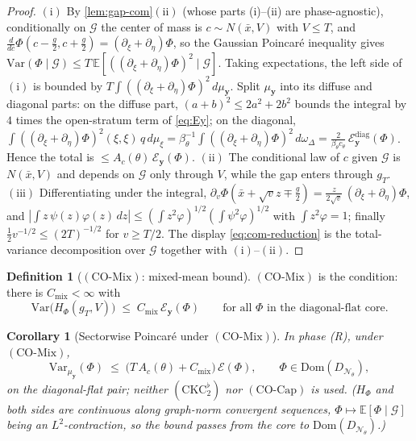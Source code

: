 \documentclass[reqno,final,11pt]{amsart}
\theoremstyle{plain}
\newtheorem{corollary}[theorem]{Corollary}
\theoremstyle{definition}
\newtheorem{definition}[theorem]{Definition}
\theoremstyle{remark}
\newcommand{\E}{\mathbb E}
\newcommand{\Dom}{\mathrm{Dom}}
\newcommand{\cE}{\mathcal E}
\newcommand{\cN}{\mathcal N}
\newcommand{\DN}{D_{\cN_\theta}}
\newcommand{\COcap}{(\mathrm{CO\text{-}Cap})}
\newcommand{\COmix}{(\mathrm{CO\text{-}Mix})}
\begin{document}
\begin{proof}
$(\mathrm i)$ By \cref{lem:gap-com}$(\mathrm{ii})$ (whose parts (i)--(ii) are
phase-agnostic), conditionally on $\mathcal G$ the center of mass is
$c\sim N(\bar x,V)$ with $V\le T$, and
$\tfrac{d}{dc}\Phi(c-\tfrac g2,c+\tfrac g2)=(\partial_\xi+\partial_\eta)\Phi$,
so the Gaussian Poincar\'e inequality gives
$\mathrm{Var}(\Phi\mid\mathcal G)\le T\,
\E[((\partial_\xi+\partial_\eta)\Phi)^2\mid\mathcal G]$. Taking expectations,
the left side of $(\mathrm i)$ is bounded by
$T\int((\partial_\xi+\partial_\eta)\Phi)^2\,d\mu_{\mathbf y}$. Split
$\mu_{\mathbf y}$ into its diffuse and diagonal parts: on the diffuse part,
$(a+b)^2\le2a^2+2b^2$ bounds the integral by $4$ times the open-stratum term of
\eqref{eq:Ey}; on the diagonal,
$\int((\partial_\xi+\partial_\eta)\Phi)^2(\xi,\xi)\,q\,d\mu_\xi
=\beta_\theta^{-1}\int((\partial_\xi+\partial_\eta)\Phi)^2\,d\omega_\Delta
=\tfrac{2}{\beta_\theta c_\theta}\,\cE^{\mathrm{diag}}_{\mathbf y}(\Phi)$.
Hence the total is $\le A_c(\theta)\,\cE_{\mathbf y}(\Phi)$.
$(\mathrm{ii})$ The conditional law of $c$ given $\mathcal G$ is $N(\bar x,V)$
and depends on $\mathcal G$ only through $V$, while the gap enters through
$g_T$.
$(\mathrm{iii})$ Differentiating under the integral,
$\partial_v\Phi(\bar x+\sqrt vz\mp\tfrac g2)=\tfrac{z}{2\sqrt v}\,
(\partial_\xi+\partial_\eta)\Phi$, and
$|\int z\,\psi(z)\varphi(z)\,dz|\le(\int z^2\varphi)^{1/2}(\int\psi^2\varphi)^{1/2}$
with $\int z^2\varphi=1$; finally $\tfrac12v^{-1/2}\le(2T)^{-1/2}$ for
$v\ge T/2$. The display \eqref{eq:com-reduction} is the total-variance
decomposition over $\mathcal G$ together with $(\mathrm i)$--$(\mathrm{ii})$.
\end{proof}

\begin{definition}[$\COmix$: mixed-mean bound]\label{def:comix}
$\COmix$ is the condition: there is $C_{\mathrm{mix}}<\infty$ with
\[
  \mathrm{Var}\bigl(H_\Phi(g_T,V)\bigr)\;\le\;C_{\mathrm{mix}}\,\cE_{\mathbf y}(\Phi)
  \qquad\text{for all }\Phi\text{ in the diagonal-flat core.}
\]
\end{definition}

\begin{corollary}[Sectorwise Poincar\'e under $\COmix$]\label{cor:comix-poincare}
In phase \textnormal{(R)}, under $\COmix$,
\[
  \mathrm{Var}_{\mu_{\mathbf y}}(\Phi)\;\le\;
  \bigl(T\,A_c(\theta)+C_{\mathrm{mix}}\bigr)\,\cE(\Phi),
  \qquad\Phi\in\Dom(\DN),
\]
on the diagonal-flat pair; neither $(\mathrm{CKC}_2^{\flat})$ nor $\COcap$ is
used. ($H_\Phi$ and both sides are continuous along graph-norm convergent
sequences, $\Phi\mapsto\E[\Phi\mid\mathcal G]$ being an $L^2$-contraction, so the
bound passes from the core to $\Dom(\DN)$.)
\end{corollary}
\end{document}
